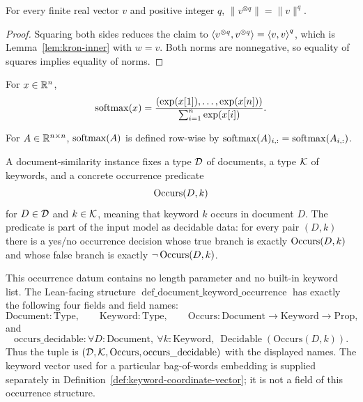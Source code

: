 \begin{lemma}
  \label{lem:kron-norm}
  For every finite real vector $v$ and positive integer $q$,
  $\|v^{\otimes q}\|=\|v\|^q$.
\end{lemma}
\begin{proof}
  Squaring both sides reduces the claim to
  $\left\langle v^{\otimes q},v^{\otimes q}\right\rangle=\left\langle v,v\right\rangle^{q}$, which is
  Lemma~\ref{lem:kron-inner} with $w=v$.  Both norms are nonnegative, so equality
  of squares implies equality of norms.
\end{proof}

\begin{definition}
  \label{def:softmax-vector}
  For $x\in\mathbb{R}^n$,
  \[
    \operatorname{softmax}(x)=\frac{(\exp(x[1]),\ldots,\exp(x[n]))}{\sum_{i=1}^n\exp(x[i])}.
  \]
\end{definition}

\begin{definition}
  \label{def:softmax-matrix}
  For $A\in\mathbb{R}^{n\times n}$, $\operatorname{softmax}(A)$ is defined row-wise by
  $\operatorname{softmax}(A)_{i,:}=\operatorname{softmax}(A_{i,:})$.
\end{definition}

\begin{definition}
  \label{def:document-keyword-occurrence}
  A document-similarity instance fixes a type ${\cal D}$ of documents, a type
  ${\cal K}$ of keywords, and a concrete occurrence predicate
  \[
    \operatorname{Occurs}(D,k)
  \]
  for $D\in{\cal D}$ and $k\in{\cal K}$, meaning that keyword $k$ occurs in
  document $D$.  The predicate is part of the input model as decidable data:
  for every pair $(D,k)$ there is a yes/no occurrence decision whose true
  branch is exactly $\operatorname{Occurs}(D,k)$ and whose false branch is exactly
  $\neg\operatorname{Occurs}(D,k)$.

  This occurrence datum contains no length parameter and no built-in keyword
  list.  The Lean-facing structure
  $\operatorname{def\_document\_keyword\_occurrence}$ has exactly the following
  four fields and field names:
  \[
    \mathrm{Document}:\mathrm{Type},\qquad
    \mathrm{Keyword}:\mathrm{Type},\qquad
    \mathrm{Occurs}:\mathrm{Document}\to\mathrm{Keyword}\to\mathrm{Prop},
  \]
  and
  \[
    \mathrm{occurs\_decidable}:
      \forall D:\mathrm{Document},\ \forall k:\mathrm{Keyword},\
      \operatorname{Decidable}(\mathrm{Occurs}(D,k)).
  \]
  Thus the tuple is
  $({\cal D},{\cal K},\operatorname{Occurs},\operatorname{occurs\_decidable})$ with the
  displayed names.  The keyword vector used for a particular bag-of-words
  embedding is supplied separately in
  Definition~\ref{def:keyword-coordinate-vector}; it is not a field of this
  occurrence structure.
\end{definition}

